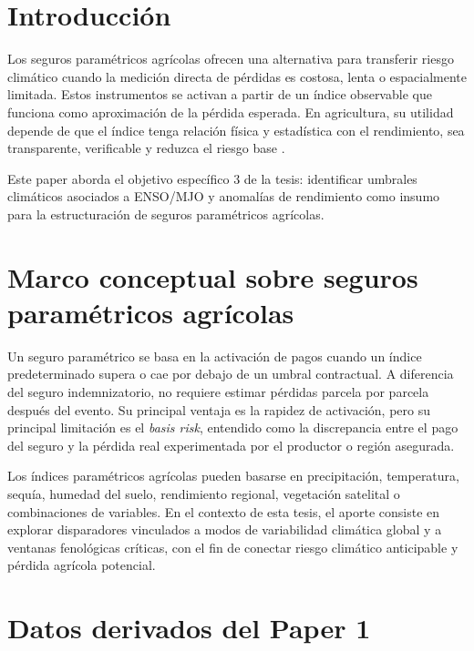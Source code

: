 \section{Introducción}

Los seguros paramétricos agrícolas ofrecen una alternativa para transferir riesgo climático cuando la medición directa de pérdidas es costosa, lenta o espacialmente limitada. Estos instrumentos se activan a partir de un índice observable que funciona como aproximación de la pérdida esperada. En agricultura, su utilidad depende de que el índice tenga relación física y estadística con el rendimiento, sea transparente, verificable y reduzca el riesgo base \parencite{carter2017index}.

Este paper aborda el objetivo específico 3 de la tesis: identificar umbrales climáticos asociados a ENSO/MJO y anomalías de rendimiento como insumo para la estructuración de seguros paramétricos agrícolas.

\section{Marco conceptual sobre seguros paramétricos agrícolas}

Un seguro paramétrico se basa en la activación de pagos cuando un índice predeterminado supera o cae por debajo de un umbral contractual. A diferencia del seguro indemnizatorio, no requiere estimar pérdidas parcela por parcela después del evento. Su principal ventaja es la rapidez de activación, pero su principal limitación es el \textit{basis risk}, entendido como la discrepancia entre el pago del seguro y la pérdida real experimentada por el productor o región asegurada.

Los índices paramétricos agrícolas pueden basarse en precipitación, temperatura, sequía, humedad del suelo, rendimiento regional, vegetación satelital o combinaciones de variables. En el contexto de esta tesis, el aporte consiste en explorar disparadores vinculados a modos de variabilidad climática global y a ventanas fenológicas críticas, con el fin de conectar riesgo climático anticipable y pérdida agrícola potencial.


\section{Datos derivados del Paper 1}

